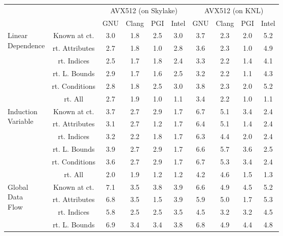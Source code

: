 \documentclass{article}
\begin{document}
\begin{longtable}{|p{2cm}|c|c|c|c|c|c|c|c|c|}
\cline{3-10} \multicolumn{2}{c|}{} & \multicolumn{4}{|c|}{ AVX512 (on Skylake)} & \multicolumn{4}{|c|}{ AVX512 (on KNL)} \\
\cline{3-10} \multicolumn{2}{c|}{}& GNU & Clang & PGI & Intel & GNU & Clang & PGI & Intel \\ \hline
\multirow{6}{*}{ \parbox{2cm}{Linear\\Dependence}} & Known at ct. & 3.0 & 1.8 & 2.5 & 3.0 & 3.7 & 2.3 & 2.0 & 5.2\\ \cline{2-10}
 & rt. Attributes & 2.7 & 1.8 & 1.0 & 2.8 & 3.6 & 2.3 & 1.0 & 4.9\\ \cline{2-10}
 & rt. Indices & 2.5 & 1.7 & 1.8 & 2.4 & 3.3 & 2.2 & 1.4 & 4.1\\ \cline{2-10}
 & rt. L. Bounds & 2.9 & 1.7 & 1.6 & 2.5 & 3.2 & 2.2 & 1.1 & 4.3\\ \cline{2-10}
 & rt. Conditions & 2.8 & 1.8 & 2.5 & 3.0 & 3.8 & 2.3 & 2.0 & 5.2\\ \cline{2-10}
 & rt. All & 2.7 & 1.9 & 1.0 & 1.1 & 3.4 & 2.2 & 1.0 & 1.1\\ \cline{2-10}
\hline
\multirow{6}{*}{ \parbox{2cm}{Induction\\Variable}} & Known at ct. & 3.7 & 2.7 & 2.9 & 1.7 & 6.7 & 5.1 & 3.4 & 2.4\\ \cline{2-10}
 & rt. Attributes & 3.1 & 2.7 & 1.2 & 1.7 & 6.4 & 5.1 & 1.4 & 2.4\\ \cline{2-10}
 & rt. Indices & 3.2 & 2.2 & 1.8 & 1.7 & 6.3 & 4.4 & 2.0 & 2.4\\ \cline{2-10}
 & rt. L. Bounds & 3.9 & 2.7 & 2.9 & 1.7 & 6.6 & 5.7 & 3.6 & 2.5\\ \cline{2-10}
 & rt. Conditions & 3.6 & 2.7 & 2.9 & 1.7 & 6.7 & 5.3 & 3.4 & 2.4\\ \cline{2-10}
 & rt. All & 2.0 & 1.9 & 1.2 & 1.2 & 4.2 & 4.6 & 1.5 & 1.3\\ \cline{2-10}
\hline
\multirow{6}{*}{ \parbox{2cm}{Global\\Data\\Flow}} & Known at ct. & 7.1 & 3.5 & 3.8 & 3.9 & 6.6 & 4.9 & 4.5 & 5.2\\ \cline{2-10}
 & rt. Attributes & 6.8 & 3.5 & 1.5 & 3.9 & 5.9 & 5.0 & 1.7 & 5.3\\ \cline{2-10}
 & rt. Indices & 5.8 & 2.5 & 2.5 & 3.5 & 4.5 & 3.2 & 3.2 & 4.5\\ \cline{2-10}
 & rt. L. Bounds & 6.9 & 3.4 & 3.4 & 3.8 & 6.8 & 4.9 & 4.4 & 4.8\\ \cline{2-10}

\end{longtable}
\end{document}
